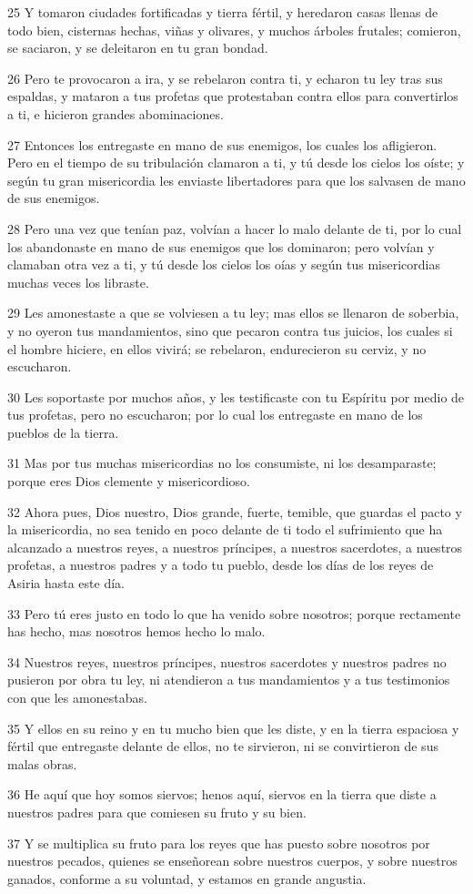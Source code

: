 \par 25 Y tomaron ciudades fortificadas y tierra fértil, y heredaron casas llenas de todo bien, cisternas hechas, viñas y olivares, y muchos árboles frutales; comieron, se saciaron, y se deleitaron en tu gran bondad. 
\par 26 Pero te provocaron a ira, y se rebelaron contra ti, y echaron tu ley tras sus espaldas, y mataron a tus profetas que protestaban contra ellos para convertirlos a ti, e hicieron grandes abominaciones.
\par 27 Entonces los entregaste en mano de sus enemigos, los cuales los afligieron. Pero en el tiempo de su tribulación clamaron a ti, y tú desde los cielos los oíste; y según tu gran misericordia les enviaste libertadores para que los salvasen de mano de sus enemigos.
\par 28 Pero una vez que tenían paz, volvían a hacer lo malo delante de ti, por lo cual los abandonaste en mano de sus enemigos que los dominaron; pero volvían y clamaban otra vez a ti, y tú desde los cielos los oías y según tus misericordias muchas veces los libraste. 
\par 29 Les amonestaste a que se volviesen a tu ley; mas ellos se llenaron de soberbia, y no oyeron tus mandamientos, sino que pecaron contra tus juicios, los cuales si el hombre hiciere, en ellos vivirá; se rebelaron, endurecieron su cerviz, y no escucharon.
\par 30 Les soportaste por muchos años, y les testificaste con tu Espíritu por medio de tus profetas, pero no escucharon; por lo cual los entregaste en mano de los pueblos de la tierra. 
\par 31 Mas por tus muchas misericordias no los consumiste, ni los desamparaste; porque eres Dios clemente y misericordioso.
\par 32 Ahora pues, Dios nuestro, Dios grande, fuerte, temible, que guardas el pacto y la misericordia, no sea tenido en poco delante de ti todo el sufrimiento que ha alcanzado a nuestros reyes, a nuestros príncipes, a nuestros sacerdotes, a nuestros profetas, a nuestros padres y a todo tu pueblo, desde los días de los reyes de Asiria hasta este día.
\par 33 Pero tú eres justo en todo lo que ha venido sobre nosotros; porque rectamente has hecho, mas nosotros hemos hecho lo malo.
\par 34 Nuestros reyes, nuestros príncipes, nuestros sacerdotes y nuestros padres no pusieron por obra tu ley, ni atendieron a tus mandamientos y a tus testimonios con que les amonestabas.
\par 35 Y ellos en su reino y en tu mucho bien que les diste, y en la tierra espaciosa y fértil que entregaste delante de ellos, no te sirvieron, ni se convirtieron de sus malas obras.
\par 36 He aquí que hoy somos siervos; henos aquí, siervos en la tierra que diste a nuestros padres para que comiesen su fruto y su bien.
\par 37 Y se multiplica su fruto para los reyes que has puesto sobre nosotros por nuestros pecados, quienes se enseñorean sobre nuestros cuerpos, y sobre nuestros ganados, conforme a su voluntad, y estamos en grande angustia.

